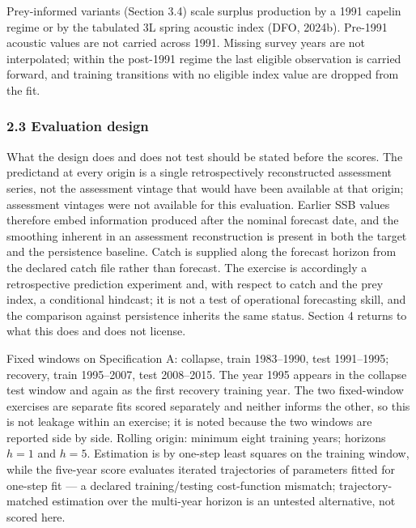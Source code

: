 \documentclass[11pt]{article}
\begin{document}
Prey-informed variants (Section 3.4) scale surplus production by a 1991
capelin regime or by the tabulated 3L spring acoustic index (DFO,
2024b). Pre-1991 acoustic values are not carried across 1991. Missing
survey years are not interpolated; within the post-1991 regime the last
eligible observation is carried forward, and training transitions with
no eligible index value are dropped from the fit.

\subsubsection{2.3 Evaluation design}\label{evaluation-design}

What the design does and does not test should be stated before the
scores. The predictand at every origin is a single retrospectively
reconstructed assessment series, not the assessment vintage that would
have been available at that origin; assessment vintages were not available for this
evaluation. Earlier SSB values therefore embed information produced
after the nominal forecast date, and the smoothing inherent in an
assessment reconstruction is present in both the target and the
persistence baseline. Catch is supplied along the forecast horizon from
the declared catch file rather than forecast. The exercise is accordingly
a retrospective prediction experiment and, with respect to catch and the
prey index, a conditional hindcast; it is not a test of operational
forecasting skill, and the comparison against persistence inherits the
same status. Section 4 returns to what this does and does not license.

Fixed windows on Specification A: collapse, train 1983--1990, test
1991--1995; recovery, train 1995--2007, test 2008--2015. The year 1995
appears in the collapse test window and again as the first recovery
training year. The two fixed-window exercises are separate fits scored
separately and neither informs the other, so this is not leakage within
an exercise; it is noted because the two windows are reported side by
side. Rolling origin:
minimum eight training years; horizons \(h=1\) and \(h=5\). Estimation
is by one-step least squares on the training window, while the five-year
score evaluates iterated trajectories of parameters fitted for one-step
fit --- a declared training/testing cost-function mismatch;
trajectory-matched estimation over the multi-year horizon is an
untested alternative, not scored here.
\end{document}
